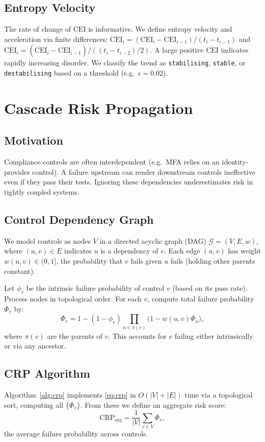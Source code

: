 \documentclass[conference]{IEEEtran}
\newcommand{\CEI}{\mathrm{CEI}}
\newcommand{\CRP}{\mathrm{CRP}}
\begin{document}
\subsection{Entropy Velocity}
The rate of change of $\CEI$ is informative. We define entropy velocity and acceleration via finite differences: $\dot{\CEI}_i = (\CEI_i - \CEI_{i-1})/(t_i - t_{i-1})$ and $\ddot{\CEI}_i = (\dot{\CEI}_i - \dot{\CEI}_{i-1})/((t_i - t_{i-2})/2)$. A large positive $\dot{\CEI}$ indicates rapidly increasing disorder. We classify the trend as \texttt{stabilising}, \texttt{stable}, or \texttt{destabilising} based on a threshold (e.g.\ $\epsilon=0.02$).

\section{Cascade Risk Propagation}
\label{sec:crp}

\subsection{Motivation}
Compliance controls are often interdependent (e.g.\ MFA relies on an identity-provider control). A failure upstream can render downstream controls ineffective even if they pass their tests. Ignoring these dependencies underestimates risk in tightly coupled systems.

\subsection{Control Dependency Graph}
We model controls as nodes $V$ in a directed acyclic graph (DAG) $\mathcal{G}=(V,E,w)$, where $(u,v)\in E$ indicates $u$ is a dependency of $v$. Each edge $(u,v)$ has weight $w(u,v)\in(0,1]$, the probability that $v$ fails given $u$ fails (holding other parents constant).

Let $\phi_v$ be the intrinsic failure probability of control $v$ (based on its pass rate). Process nodes in topological order. For each $v$, compute total failure probability $\Phi_v$ by:
\[
  \Phi_v = 1 - (1 - \phi_v)\prod_{u \in \pi(v)}\bigl(1 - w(u,v)\Phi_u\bigr),
  \label{eq:crp}
\]
where $\pi(v)$ are the parents of $v$. This accounts for $v$ failing either intrinsically or via any ancestor.

\subsection{CRP Algorithm}
Algorithm~\ref{alg:crp} implements \eqref{eq:crp} in $O(|V|+|E|)$ time via a topological sort, computing all $\{\Phi_v\}$. From these we define an aggregate risk score:
\[
  \CRP_{\text{org}} = \frac{1}{|V|}\sum_{v\in V} \Phi_v,
  \label{eq:crp_org}
\]
the average failure probability across controls.
\end{document}

